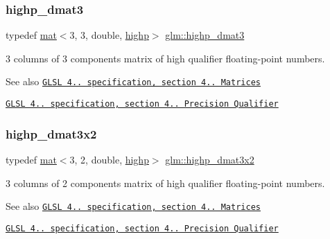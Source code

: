 \subsubsection{\texorpdfstring{highp\+\_\+dmat3}{highp\_dmat3}}
{\footnotesize\ttfamily typedef \hyperlink{structglm_1_1mat}{mat}$<$3, 3, double, \hyperlink{namespaceglm_a36ed105b07c7746804d7fdc7cc90ff25ac6f7eab42eacbb10d59a58e95e362074}{highp}$>$ \hyperlink{group__core__precision_ga2e305d56d01a4553a7fd2b6d2c580fa0}{glm\+::highp\+\_\+dmat3}}

3 columns of 3 components matrix of high qualifier floating-\/point numbers.

\begin{DoxySeeAlso}{See also}
\href{http://www.opengl.org/registry/doc/GLSLangSpec.4.20.8.pdf}{\tt G\+L\+SL 4.. specification, section 4.. Matrices} 

\href{http://www.opengl.org/registry/doc/GLSLangSpec.4.20.8.pdf}{\tt G\+L\+SL 4.. specification, section 4.. Precision Qualifier} 
\end{DoxySeeAlso}
\mbox{\label{group__core__precision_ga8454b92a3917b17a8663f2409cb3100d}} 
\subsubsection{\texorpdfstring{highp\+\_\+dmat3x2}{highp\_dmat3x2}}
{\footnotesize\ttfamily typedef \hyperlink{structglm_1_1mat}{mat}$<$3, 2, double, \hyperlink{namespaceglm_a36ed105b07c7746804d7fdc7cc90ff25ac6f7eab42eacbb10d59a58e95e362074}{highp}$>$ \hyperlink{group__core__precision_ga8454b92a3917b17a8663f2409cb3100d}{glm\+::highp\+\_\+dmat3x2}}

3 columns of 2 components matrix of high qualifier floating-\/point numbers.

\begin{DoxySeeAlso}{See also}
\href{http://www.opengl.org/registry/doc/GLSLangSpec.4.20.8.pdf}{\tt G\+L\+SL 4.. specification, section 4.. Matrices} 

\href{http://www.opengl.org/registry/doc/GLSLangSpec.4.20.8.pdf}{\tt G\+L\+SL 4.. specification, section 4.. Precision Qualifier} 
\end{DoxySeeAlso}
\mbox{\label{group__core__precision_gae5f677e4437523476511c84a17206ac2}} 
